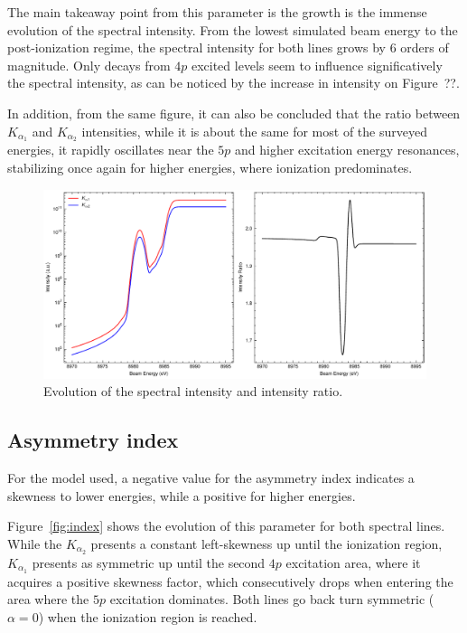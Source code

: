 The main takeaway point from this parameter is the growth is the immense evolution of the spectral intensity. From the lowest simulated beam energy to the post-ionization regime, the spectral intensity for both lines grows by 6 orders of magnitude. Only decays from $4p$ excited levels seem to influence significatively the spectral intensity, as can be noticed by the increase in intensity on Figure~??.

In addition, from the same figure, it can also be concluded that the ratio between $K_{\alpha_1}$ and $K_{\alpha_2}$ intensities, while it is about the same for most of the surveyed energies, it rapidly oscillates near the $5p$ and higher excitation energy resonances, stabilizing once again for higher energies, where ionization predominates.

\begin{figure}
    \centering
    \includegraphics[width=\linewidth]{Chapters/Figures/Chapter5/assym_intensities.pdf}
    \caption{Evolution of the spectral intensity and intensity ratio.}\label{fig:intensity}
\end{figure}
\subsection{Asymmetry index}

For the model used, a negative value for the asymmetry index indicates a skewness to lower energies, while a positive for higher energies.

Figure~\ref{fig:index} shows the evolution of this parameter for both spectral lines.
While the $K_{\alpha_2}$ presents a constant left-skewness up until the ionization region, $K_{\alpha_1}$ presents as symmetric up until the second $4p$ excitation area, where it acquires a positive skewness factor, which consecutively drops when entering the area where the $5p$ excitation dominates. Both lines go back turn symmetric ($\alpha=0$) when the ionization region is reached.

